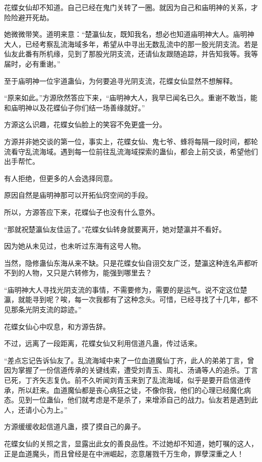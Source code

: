 \begin{this_body}
花蝶女仙却不知道。自己已经在鬼门关转了一圈。就因为自己和庙明神的关系，才险险避开死劫。

她微微带笑。道明来意：“楚瀛仙友，既知我名，想必也知道庙明神大人。庙明神大人，已经考察乱流海域多年，希望从中寻出无数乱流中的那一股光阴支流。若是仙友此番有所机缘，见到了那股光阴支流，还请仙友跟随追踪，并告知我等。我等届时，必有重谢。”

至于庙明神一位宇道蛊仙，为何要追寻光阴支流，花蝶女仙显然不想解释。

“原来如此。”方源欣然答应下来，“庙明神大人，我早已闻名已久。重谢不敢当，能和庙明神以及花蝶仙子你们结一场善缘就好。”

方源这么识趣，花蝶女仙脸上的笑容不免更盛一分。

方源并非她交谈的第一位，事实上，花蝶女仙、鬼七爷、蜂将每隔一段时间，都轮流看守乱流海域。遇到每一位前往乱流海域探索的蛊仙，都会上前交谈，希望他们出手帮忙。

有人拒绝，但更多的人会选择同意。

原因自然是庙明神那可以开拓仙窍空间的手段。

所以，方源答应下来，花蝶仙子也没有什么意外。

“那就祝楚瀛仙友佳运了。”花蝶女仙转身就要离开，她对楚瀛并不看好。

因为她从未见过，也未听过东海有这号人物。

当然，隐修蛊仙东海从来不缺。只是花蝶女仙自诩交友广泛，楚瀛这种连名声都听不到的人物，又只是六转修为，能强到哪里去？

“庙明神大人寻找光阴支流的事情，不需要修为，需要的是运气。说不定这位楚瀛，就能寻到呢？唉，每一次我都有了这种念头。可惜，已经寻找了十几年，都不见那条光阴支流的踪迹。”

花蝶女仙心中叹息，和方源告辞。

不过，远离了一段距离，花蝶女仙又利用信道凡蛊，传过话来。

“差点忘记告诉仙友了。乱流海域中来了一位血道魔仙丁齐，此人的弟弟丁言，曾因为掌握了一份信道传承的关键线索，遭受刘青玉、周礼、汤诵等人的追杀。丁言已死，丁齐矢志复仇。前不久听闻刘青玉来到了乱流海域，似乎是要开启信道传承，所以赶来。血道魔仙都是丧心病狂之徒，不像你我，他们的心理已经魔化病态。见到一位蛊仙，他们就考虑是不是杀了，来增添自己的战力。仙友若是遇到此人，还请小心为上。”

方源缓缓收起信道凡蛊，摸了摸自己的鼻子。

花蝶女仙的关照之言，显露出此女的善良品性。不过她却不知道，她叮嘱的这人，正是血道魔头，而且曾经是在中洲崛起，恣意屠戮千万生命，罪孽深重之人！

\end{this_body}

